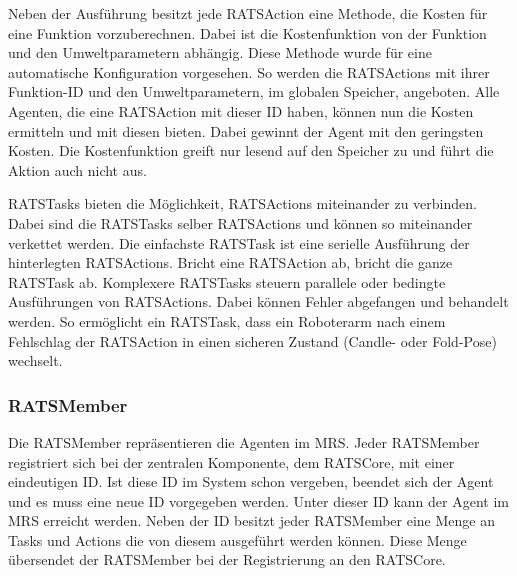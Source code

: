 Neben der Ausführung besitzt jede RATSAction eine Methode, die Kosten für eine Funktion vorzuberechnen. Dabei ist die Kostenfunktion von der Funktion und den Umweltparametern abhängig. Diese Methode wurde für eine automatische Konfiguration vorgesehen. So werden die RATSActions mit ihrer Funktion-ID und den Umweltparametern, im globalen Speicher, angeboten. Alle Agenten, die eine RATSAction mit dieser ID haben, können nun die Kosten ermitteln und mit diesen bieten. Dabei gewinnt der Agent mit den geringsten Kosten. Die Kostenfunktion greift nur lesend auf den Speicher zu und führt die Aktion auch nicht aus.

RATSTasks bieten die Möglichkeit, RATSActions miteinander zu verbinden. Dabei sind die RATSTasks selber RATSActions und können so miteinander verkettet werden. Die einfachste RATSTask ist eine serielle Ausführung der hinterlegten RATSActions. Bricht eine RATSAction ab, bricht die ganze RATSTask ab. Komplexere RATSTasks steuern parallele oder bedingte Ausführungen von RATSActions. Dabei können Fehler abgefangen und behandelt werden. So ermöglicht ein RATSTask, dass ein Roboterarm nach einem Fehlschlag der RATSAction in einen sicheren Zustand (Candle- oder Fold-Pose) wechselt.


\subsubsection{RATSMember}
\label{sec:devmember}
Die RATSMember repräsentieren die Agenten im MRS. Jeder RATSMember registriert sich bei der zentralen Komponente, dem RATSCore, mit einer eindeutigen ID. Ist diese ID im System schon vergeben, beendet sich der Agent und es muss eine neue ID vorgegeben werden. Unter dieser ID kann der Agent im MRS erreicht werden. Neben der ID besitzt jeder RATSMember eine Menge an Tasks und Actions die von diesem ausgeführt werden können. Diese Menge übersendet der RATSMember bei der Registrierung an den RATSCore. 

